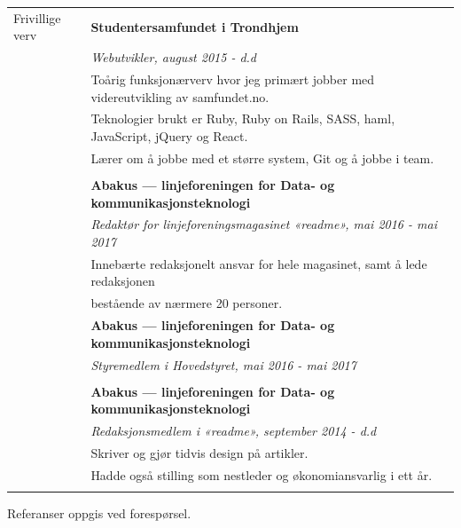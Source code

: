 \documentclass[letterpaper,10pt,oneside]{article}
\begin{document}
\begin{longtable}{@{} l l}
 \Large{Frivillige verv}    & \textbf{Studentersamfundet i Trondhjem} \\
 & \textit{Webutvikler, august 2015 - d.d}\\
     & Toårig funksjonærverv hvor jeg primært jobber med videreutvikling av samfundet.no. \\
     & Teknologier brukt er Ruby, Ruby on Rails, SASS, haml, JavaScript, jQuery og React. \\
     & Lærer om å jobbe med et større system, Git og å jobbe i team.\\
     & \\
     & \textbf{Abakus --- linjeforeningen for Data- og kommunikasjonsteknologi} \\
     & \textit{Redaktør for linjeforeningsmagasinet «readme», mai 2016 - mai 2017}\\
     & Innebærte redaksjonelt ansvar for hele magasinet, samt å lede redaksjonen \\
     & bestående av nærmere 20 personer.
     & \\
     & \textbf{Abakus --- linjeforeningen for Data- og kommunikasjonsteknologi} \\
     & \textit{Styremedlem i Hovedstyret, mai 2016 - mai 2017}\\
     & \\
     & \textbf{Abakus --- linjeforeningen for Data- og kommunikasjonsteknologi} \\
     & \textit{Redaksjonsmedlem i «readme», september 2014 - d.d}\\
     & Skriver og gjør tidvis design på artikler. \\
     & Hadde også stilling som nestleder og økonomiansvarlig i ett år.\\
     & \\

\end{longtable}

Referanser oppgis ved forespørsel.
\end{document}
